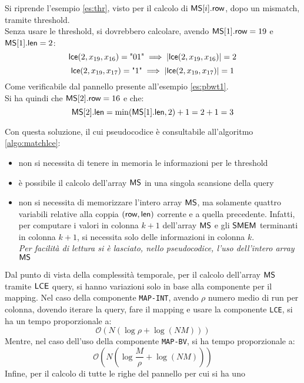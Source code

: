 \begin{esempio}
  Si riprende l'esempio \ref{es:thr}, visto per il calcolo di $\mbox{\rm {\sf MS}}[i].\mbox{\rm {\sf row}}$,
  dopo un mismatch, tramite threshold. \\
  Senza usare le threshold, si dovrebbero
  calcolare, avendo $\mbox{\rm {\sf MS}}[1].\mbox{\rm {\sf row}}=19$ e $\mbox{\rm {\sf MS}}[1].\mbox{\rm {\sf len}} =2$:
  \[\mbox{\rm {\sf lce}}(2, x_{19}, x_{16}) = \mbox{"01"} \implies|\mbox{\rm {\sf lce}}(2, x_{19}, x_{16})|=2\]
  \[\mbox{\rm {\sf lce}}(2, x_{19}, x_{17}) = \mbox{"1"} \implies|\mbox{\rm {\sf lce}}(2, x_{19}, x_{17})|=1\]
  Come verificabile dal pannello presente all'esempio \ref{es:pbwt1}.\\
  Si ha quindi che $\mbox{\rm {\sf MS}}[2].\mbox{\rm {\sf row}}=16$ e che:
  \[\mbox{\rm {\sf MS}}[2].\mbox{\rm {\sf len}}=\min(\mbox{\rm {\sf MS}}[1].\mbox{\rm {\sf len}}, 2)+1=2+1=3\]
\end{esempio}
\noindent
Con questa soluzione, il cui pseudocodice è consultabile all'algoritmo
\ref{algo:matchlce}: 
\begin{itemize}
  \item non si necessita di tenere in memoria le informazioni per le
  threshold
  \item è possibile il calcolo dell'array $\mbox{\rm {\sf MS}}$ in una singola scansione della
  query
  \item non si necessita di memorizzare l'intero array $\mbox{\rm {\sf MS}}$, ma solamente
  quattro variabili relative alla coppia
  $(\mbox{\rm {\sf row}},\mbox{\rm {\sf len}})$ corrente e a quella precedente. Infatti, per computare i valori
  in 
  colonna $k+1$ dell'array $\mbox{\rm {\sf MS}}$ e gli $\mbox{\rm {\sf SMEM}}$ terminanti in colonna $k+1$, si
  necessita solo delle informazioni in colonna $k$. \\
  \textit{Per facilità di
    lettura si è lasciato, nello pseudocodice, l'uso dell'intero array $\mbox{\rm {\sf MS}}$}
\end{itemize}
Dal punto di vista della complessità temporale, per il calcolo dell'array $\mbox{\rm {\sf MS}}$
tramite $\mbox{\rm {\sf LCE}}$ query, si hanno variazioni solo in base alla componente per il
mapping.  
Nel caso della componente \texttt{MAP-INT}, avendo $\rho$ numero medio di run
per colonna, dovendo iterare la query, fare il mapping e usare la
componente \texttt{LCE}, si 
ha un tempo proporzionale a: 
\begin{equation}
  \label{eq:mslce22}
  \mathcal{O}(N(\log \rho+\log (NM)))
\end{equation}
Mentre, nel caso dell'uso della componente \texttt{MAP-BV}, si ha tempo
proporzionale a:
\begin{equation}
  \label{eq:mslce3}
  \mathcal{O}\left(N\left(\log \frac{M}{\rho}+\log (NM)\right)\right)
\end{equation}
Infine, per il calcolo di tutte le righe del pannello per cui si ha uno
